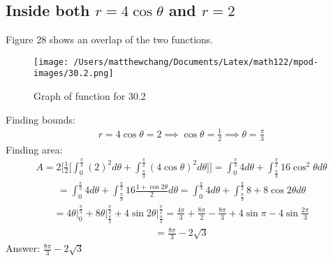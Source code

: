 \documentclass{article}
\begin{document}
\subsection{Inside both $r = 4 \cos{\theta}$ and $r = 2$}
Figure 28 shows an overlap of the two functions. \\[10pt]
\begin{figure}
	\centering
	\texttt{[image: /Users/matthewchang/Documents/Latex/math122/mpod-images/30.2.png]}
	\caption{Graph of function for 30.2}
\end{figure}
Finding bounds:
\begin{align*}
	r = 4\cos{\theta} = 2 \implies \cos{\theta} = \frac{1}{2} \implies \theta = \frac{\pi}{3}
\end{align*}
Finding area: 
\begin{align*}
	A = 2 \bigg[ \frac{1}{2} \bigg[ \int_0^{\frac{\pi}{3}} (2)^2 d\theta + \int_{\frac{\pi}{3}}^{\frac{\pi}{2}} (4\cos{\theta})^2 d\theta \bigg] \bigg] = \int_0^{\frac{\pi}{3}} 4d\theta + \int_{\frac{\pi}{3}}^{\frac{\pi}{2}} 16\cos^2{\theta}d\theta
\end{align*}
\begin{align*}
	= \int_0^{\frac{\pi}{3}} 4d\theta + \int_{\frac{\pi}{3}}^{\frac{\pi}{2}} 16 \frac{1 + \cos{2\theta}}{2} d\theta = \int_0^{\frac{\pi}{3}} 4d\theta + \int_{\frac{\pi}{3}}^{\frac{\pi}{2}} 8 + 8\cos{2\theta} d\theta
\end{align*}
\begin{align*}
	= 4\theta \bigg|_0^{\frac{\pi}{3}} + 8\theta \bigg|_{\frac{\pi}{3}}^{\frac{\pi}{2}} + 4\sin{2\theta} \bigg|_{\frac{\pi}{3}}^{\frac{\pi}{2}} = \frac{4\pi}{3} + \frac{8\pi}{2} - \frac{8\pi}{3} + 4\sin{\pi} - 4\sin{\frac{2\pi}{3}}
\end{align*}
\begin{align*}
	= \frac{8\pi}{3} - 2\sqrt{3}
\end{align*}
Answer: $\frac{8\pi}{3} - 2\sqrt{3}$

\end{document}
